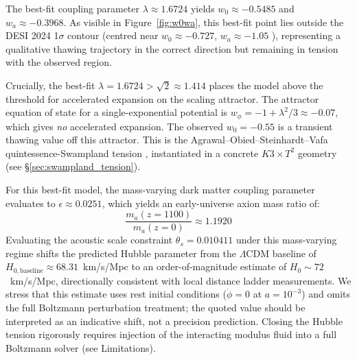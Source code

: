 \documentclass[12pt]{article}
\begin{document}
The best-fit coupling parameter $\lambda \approx 1.6724$ yields $w_0 \approx -0.5485$ and $w_a \approx -0.3968$. As visible in Figure~\ref{fig:w0wa}, this best-fit point lies outside the DESI 2024 1$\sigma$ contour (centred near $w_0\approx-0.727$, $w_a\approx-1.05$ \cite{desi2024}), representing a qualitative thawing trajectory in the correct direction but remaining in tension with the observed region.

Crucially, the best-fit $\lambda = 1.6724 > \sqrt{2} \approx 1.414$ places the model above the threshold for accelerated expansion on the scaling attractor. The attractor equation of state for a single-exponential potential is $w_\phi = -1 + \lambda^2/3 \approx -0.07$, which gives \emph{no} accelerated expansion. The observed $w_0 = -0.55$ is a transient thawing value off this attractor. This is the Agrawal--Obied--Steinhardt--Vafa quintessence-Swampland tension \cite{agrawal2018cosmological}, instantiated in a concrete $K3\times T^2$ geometry (see §\ref{sec:swampland_tension}). 

For this best-fit model, the mass-varying dark matter coupling parameter evaluates to $\epsilon \approx 0.0251$, which yields an early-universe axion mass ratio of:
\begin{equation}
\frac{m_a(z=1100)}{m_a(z=0)} \approx 1.1920
\end{equation}
Evaluating the acoustic scale constraint $\theta_s = 0.010411$ under this mass-varying regime shifts the predicted Hubble parameter from the $\Lambda$CDM baseline of $H_{0,\text{baseline}} \approx 68.31$~km/s/Mpc to an order-of-magnitude estimate of $H_0 \sim 72$~km/s/Mpc, directionally consistent with local distance ladder measurements. We stress that this estimate uses rest initial conditions ($\dot{\phi}=0$ at $a=10^{-3}$) and omits the full Boltzmann perturbation treatment; the quoted value should be interpreted as an indicative shift, not a precision prediction. Closing the Hubble tension rigorously requires injection of the interacting modulus fluid into a full Boltzmann solver (see Limitations).
\end{document}

